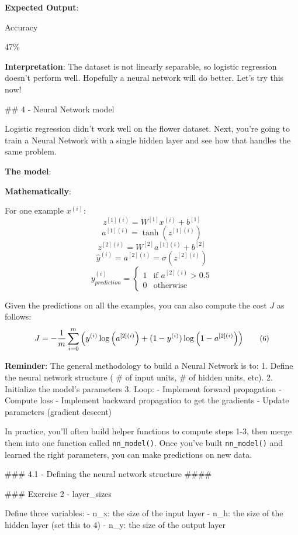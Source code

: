 \documentclass[11pt]{article}
\begin{document}
    \textbf{Expected Output}:

Accuracy

47\%

    \textbf{Interpretation}: The dataset is not linearly separable, so
logistic regression doesn't perform well. Hopefully a neural network
will do better. Let's try this now!

    \#\# 4 - Neural Network model

Logistic regression didn't work well on the flower dataset. Next, you're
going to train a Neural Network with a single hidden layer and see how
that handles the same problem.

\textbf{The model}:

\textbf{Mathematically}:

For one example \(x^{(i)}\):
\[z^{[1] (i)} =  W^{[1]} x^{(i)} + b^{[1]}\tag{1}\]
\[a^{[1] (i)} = \tanh(z^{[1] (i)})\tag{2}\]
\[z^{[2] (i)} = W^{[2]} a^{[1] (i)} + b^{[2]}\tag{3}\]
\[\hat{y}^{(i)} = a^{[2] (i)} = \sigma(z^{ [2] (i)})\tag{4}\]
\[y^{(i)}_{prediction} = \begin{cases} 1 & \mbox{if } a^{[2](i)} > 0.5 \\ 0 & \mbox{otherwise } \end{cases}\tag{5}\]

Given the predictions on all the examples, you can also compute the cost
\(J\) as follows:
\[J = - \frac{1}{m} \sum\limits_{i = 0}^{m} \large\left(\small y^{(i)}\log\left(a^{[2] (i)}\right) + (1-y^{(i)})\log\left(1- a^{[2] (i)}\right)  \large  \right) \small \tag{6}\]

\textbf{Reminder}: The general methodology to build a Neural Network is
to: 1. Define the neural network structure ( \# of input units, \# of
hidden units, etc). 2. Initialize the model's parameters 3. Loop: -
Implement forward propagation - Compute loss - Implement backward
propagation to get the gradients - Update parameters (gradient descent)

In practice, you'll often build helper functions to compute steps 1-3,
then merge them into one function called \texttt{nn\_model()}. Once
you've built \texttt{nn\_model()} and learned the right parameters, you
can make predictions on new data.

    \#\#\# 4.1 - Defining the neural network structure \#\#\#\#

\#\#\# Exercise 2 - layer\_sizes

Define three variables: - n\_x: the size of the input layer - n\_h: the
size of the hidden layer (set this to 4) - n\_y: the size of the output
layer
\end{document}
